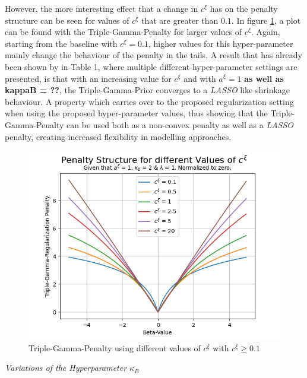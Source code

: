 \documentclass[12pt,a4paper]{article}
\begin{document}
However, the more interesting effect that a change in $c^\xi$ has on the penalty structure can be seen for values of $c^\xi$ that are greater than $0.1$. In figure \ref{fig:ChangeInC_LargeValues}, a plot can be found with the Triple-Gamma-Penalty for larger values of $c^\xi$. Again, starting from the baseline with $c^\xi = 0.1$, higher values for this hyper-parameter mainly change the behaviour of the penalty in the tails. A result that has already been shown by \textcite{TGP2020} in Table 1, where multiple different hyper-parameter settings are presented, is that with an increasing value for $c^\xi$ and with $a^\xi = 1$ \textbf{as well as kappaB = ??}, the Triple-Gamma-Prior converges to a \textit{LASSO} like shrinkage behaviour. A property which carries over to the proposed regularization setting when using the proposed hyper-parameter values, thus showing that the Triple-Gamma-Penalty can be used both as a non-convex penalty as well as a \textit{LASSO} penalty, creating increased flexibility in modelling approaches. 

\begin{figure}[!h]
\centering
\includegraphics[scale=0.75]{../02_simulation/021_simulation_figures/TGPenalty_ChangeInC_Part1.png}
\caption{Triple-Gamma-Penalty using different values of $c^\xi$ with $c^\xi \geq 0.1$}
\label{fig:ChangeInC_LargeValues}
\end{figure}

\textit{Variations of the Hyperparameter $\kappa_B$}\\
\end{document}
